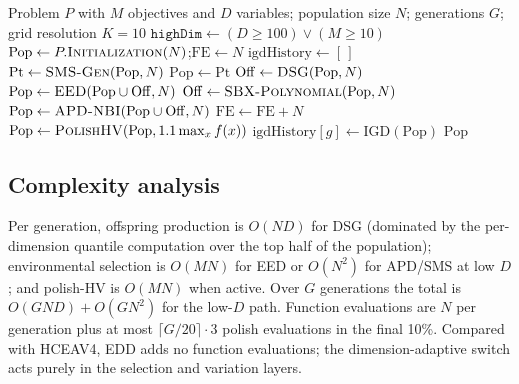 \documentclass[preprint,12pt]{elsarticle}
\begin{document}
\begin{algorithm}[H]
\caption{EDD}
\label{alg:edd}
\begin{algorithmic}[1]
\Require Problem $P$ with $M$ objectives and $D$ variables; population size
$N$; generations $G$; grid resolution $K=10$
\State $\texttt{highDim} \gets (D \ge 100) \lor (M \ge 10)$
\State $\mathrm{Pop} \gets P.\textsc{Initialization}(N)$;\quad $\mathrm{FE} \gets N$
\State $\mathrm{igdHistory} \gets [\,]$
        \State $\mathrm{Pt} \gets \textsc{SMS-Gen}(\mathrm{Pop}, N)$
            \State $\mathrm{Pop} \gets \mathrm{Pt}$
        \EndIf
    \EndIf
        \State $\mathrm{Off} \gets \textsc{DSG}(\mathrm{Pop}, N)$
        \State $\mathrm{Pop} \gets \textsc{EED}(\mathrm{Pop} \cup \mathrm{Off}, N)$
    \Else
        \State $\mathrm{Off} \gets \textsc{SBX-Polynomial}(\mathrm{Pop}, N)$
        \State $\mathrm{Pop} \gets \textsc{APD-NBI}(\mathrm{Pop} \cup \mathrm{Off}, N)$
    \EndIf
    \State $\mathrm{FE} \gets \mathrm{FE} + N$
        \State $\mathrm{Pop} \gets \textsc{PolishHV}(\mathrm{Pop}, 1.1\max_x f(x))$
    \EndIf
    \State $\mathrm{igdHistory}[g] \gets \mathrm{IGD}(\mathrm{Pop})$
\EndFor
\State \Return $\mathrm{Pop}$
\end{algorithmic}
\end{algorithm}

\subsection{Complexity analysis}

Per generation, offspring production is $O(ND)$ for DSG (dominated by the
per-dimension quantile computation over the top half of the population);
environmental selection is $O(MN)$ for EED or $O(N^2)$ for APD/SMS at low
$D$; and polish-HV is $O(MN)$ when active. Over $G$ generations the total is
$O(GND) + O(GN^2)$ for the low-$D$ path. Function evaluations are $N$ per
generation plus at most $\lceil G/20 \rceil \cdot 3$ polish evaluations in
the final 10\%. Compared with HCEAV4, EDD adds no function evaluations; the
dimension-adaptive switch acts purely in the selection and variation layers.
\end{document}
